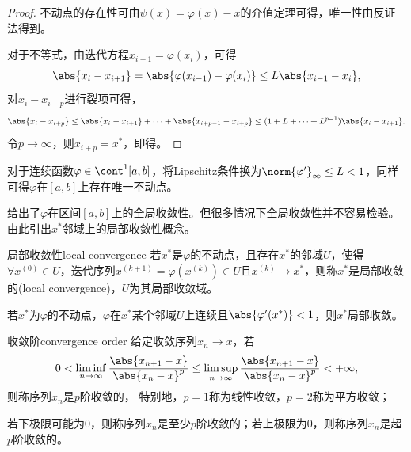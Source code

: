\begin{proof}
    不动点的存在性可由$\psi(x)=\varphi(x)-x$的介值定理可得，唯一性由反证法得到。

    对于不等式，由迭代方程$x_{i+1}=\varphi(x_i)$，可得
    \[
        \abs{x_i-x_{i+1}}=\abs{\varphi(x_{i-1})-\varphi(x_i)}\leq L\abs{x_{i-1}-x_i},
    \]
    对$x_i-x_{i+p}$进行裂项可得，
    \[
        \abs{x_i-x_{i+p}}\leq\abs{x_i-x_{i+1}}+\cdots+\abs{x_{i+p-1}-x_{i+p}}\leq(1+L+\cdots+L^{p-1})\abs{x_i-x_{i+1}}.
    \]
    令$p\to\infty$，则$x_{i+p}=x^*$，即得。
\end{proof}

\begin{corollary}
    对于连续函数$\varphi\in\cont^1[a,b]$，将Lipschitz条件换为$\norm{\varphi'}_\infty\leq L<1$，同样可得$\varphi$在$[a,b]$上存在唯一不动点。
\end{corollary}

\begin{remark}
     给出了$\varphi$在区间$[a,b]$上的全局收敛性。但很多情况下全局收敛性并不容易检验。由此引出$x^*$邻域上的局部收敛性概念。
\end{remark}

\begin{definition}
    {局部收敛性}{local convergence}
    若$x^*$是$\varphi$的不动点，且存在$x^*$的邻域$U$，使得$\forall x^{(0)}\in U$，迭代序列$x^{(k+1)}=\varphi(x^{(k)})\in U$且$x^{(k)}\to x^*$，则称$x^*$是局部收敛的(local convergence)，$U$为其局部收敛域。
\end{definition}

\begin{corollary}
    若$x^*$为$\varphi$的不动点，$\varphi$在$x^*$某个邻域$U$上连续且$\abs{\varphi'(x^*)}<1$，则$x^*$局部收敛。
\end{corollary}

\begin{definition}
    {收敛阶}{convergence order}
    给定收敛序列$x_n\to x$，若
    \begin{equation}
        0<\liminf_{n\to\infty}\frac{\abs{x_{n+1}-x}}{\abs{x_n-x}^p}\leq\limsup_{n\to\infty}\frac{\abs{x_{n+1}-x}}{\abs{x_n-x}^p}<+\infty,
    \end{equation}
    则称序列$x_n$是$p$阶收敛的，
    特别地，$p=1$称为线性收敛，$p=2$称为平方收敛；

    若下极限可能为0，则称序列$x_n$是至少$p$阶收敛的；若上极限为0，则称序列$x_n$是超$p$阶收敛的。
\end{definition}

